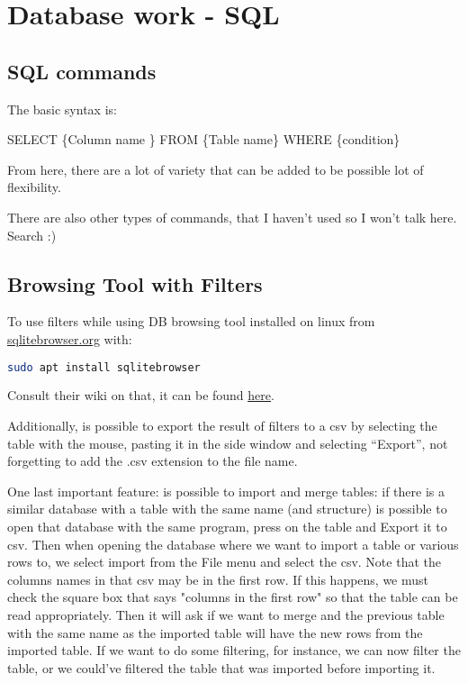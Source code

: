 

\section{Database work - SQL}


\subsection{SQL commands}

\par The basic syntax is:

SELECT \{Column name \} FROM  \{Table name\} WHERE \{condition\}

From here, there are a lot of variety that can be added to be possible lot of flexibility. 

There are also other types of commands, that I haven't used so I won't talk here. Search :)

\subsection{Browsing Tool with Filters}
\par To use filters while using DB browsing tool installed on linux from \href{https://sqlitebrowser.org/}{\ul{sqlitebrowser.org}} with:
\begin{lstlisting}[language = bash]
    sudo apt install sqlitebrowser
\end{lstlisting}
Consult their wiki on that, it can be found \href{https://github.com/sqlitebrowser/sqlitebrowser/wiki/Using-the-Filters}{\ul{here}}.

\vspace{1cm}

\par Additionally, is possible to export the result of filters to a csv by selecting the table with the mouse, pasting it in the side window and selecting ``Export'', not forgetting to add the .csv extension to the file name.

\par One last important feature: is possible to import and merge tables: if there is a similar database with a table with the same name (and structure) is possible to open that database with the same program, press on the table and Export it to csv. Then when opening the database where we want to import a table or various rows to, we select import from the File menu and select the csv. Note that the columns names in that csv may be in the first row. If this happens, we must check the square box that says "columns in the first row" so that the table can be read appropriately. Then it will ask if we want to merge and the previous table with the same name as the imported table will have the new rows from the imported table. If we want to do some filtering, for instance,  we can now filter the table, or we could've filtered the table that was imported before importing it.




